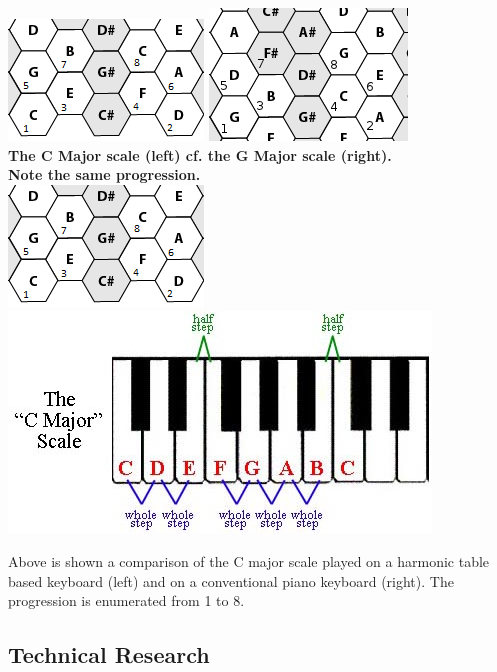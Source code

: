 \documentclass[10pt,a4paper]{article}
\begin{document}
\pagebreak
\begin{center}
\includegraphics[scale=0.7]{scale.png}
\hspace{10pt}
\includegraphics[scale=0.5]{scale3.png}\\
\textbf{The C Major scale (left) cf. the G Major scale (right). \\ Note the same progression.}\\
\includegraphics[scale=0.7]{scale.png}
\includegraphics[scale=1.5]{scale2.jpg}
\end{center}
Above is shown a comparison of the C major scale played on a harmonic table based keyboard (left) and on a conventional piano keyboard (right). The progression is enumerated from 1 to 8.

\subsection{Technical Research}
\end{document}
